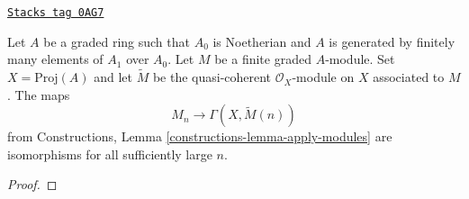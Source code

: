 \begin{lemma}
\label{coherent-lemma-recover-tail-graded-module}
\href{https://stacks.math.columbia.edu/tag/0AG7}{\texttt{Stacks tag 0AG7}}

Let $A$ be a graded ring such that $A_0$ is Noetherian and $A$ is generated
by finitely many elements of $A_1$ over $A_0$. Let $M$ be a
finite graded $A$-module. Set $X = \text{Proj}(A)$ and let $\widetilde{M}$
be the quasi-coherent $\mathcal{O}_X$-module on $X$ associated to $M$.
The maps
$$
M_n \longrightarrow \Gamma(X, \widetilde{M}(n))
$$
from Constructions, Lemma \ref{constructions-lemma-apply-modules}
are isomorphisms for all sufficiently large $n$.
\end{lemma}

\begin{proof}


\end{proof}
